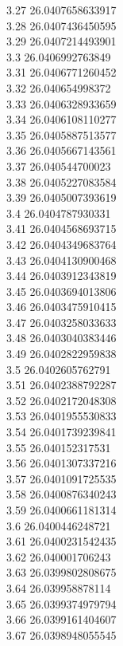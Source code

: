 {3.27	26.0407658633917\\
3.28	26.0407436450595\\
3.29	26.0407214493901\\
3.3	26.0406992763849\\
3.31	26.0406771260452\\
3.32	26.040654998372\\
3.33	26.0406328933659\\
3.34	26.0406108110277\\
3.35	26.0405887513577\\
3.36	26.0405667143561\\
3.37	26.040544700023\\
3.38	26.0405227083584\\
3.39	26.0405007393619\\
3.4	26.0404787930331\\
3.41	26.0404568693715\\
3.42	26.0404349683764\\
3.43	26.0404130900468\\
3.44	26.0403912343819\\
3.45	26.0403694013806\\
3.46	26.0403475910415\\
3.47	26.0403258033633\\
3.48	26.0403040383446\\
3.49	26.0402822959838\\
3.5	26.0402605762791\\
3.51	26.0402388792287\\
3.52	26.0402172048308\\
3.53	26.0401955530833\\
3.54	26.0401739239841\\
3.55	26.040152317531\\
3.56	26.0401307337216\\
3.57	26.0401091725535\\
3.58	26.0400876340243\\
3.59	26.0400661181314\\
3.6	26.0400446248721\\
3.61	26.0400231542435\\
3.62	26.040001706243\\
3.63	26.0399802808675\\
3.64	26.039958878114\\
3.65	26.0399374979794\\
3.66	26.0399161404607\\
3.67	26.0398948055545\\
}
